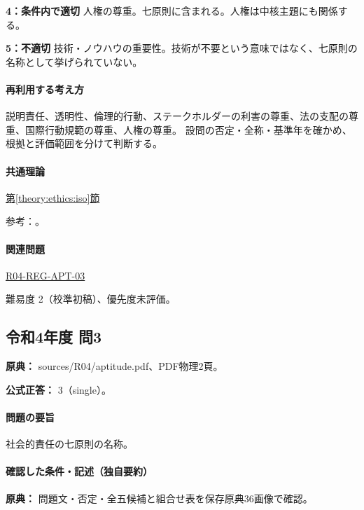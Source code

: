 \noindent\textbf{4：条件内で適切} 人権の尊重。七原則に含まれる。人権は中核主題にも関係する。\par

\noindent\textbf{5：不適切} 技術・ノウハウの重要性。技術が不要という意味ではなく、七原則の名称として挙げられていない。\par

\paragraph{再利用する考え方} 説明責任、透明性、倫理的行動、ステークホルダーの利害の尊重、法の支配の尊重、国際行動規範の尊重、人権の尊重。 設問の否定・全称・基準年を確かめ、根拠と評価範囲を分けて判断する。

\paragraph{共通理論} \hyperref[theory:ethics:iso]{第\ref*{theory:ethics:iso}節}

\par 参考：\cite{eth54_iso_brochure,iso26000}。

\paragraph{関連問題} \hyperref[q:r04-reg-apt-03]{R04-REG-APT-03}

\par 難易度 2（校準初稿）、優先度未評価。

\subsection{令和4年度 問3}
\label{q:r04-reg-apt-03}

\noindent\textbf{原典：} sources/R04/aptitude.pdf、PDF物理2頁。

\textbf{公式正答：} 3（single）。

\paragraph{問題の要旨} 社会的責任の七原則の名称。

\paragraph{確認した条件・記述（独自要約）}\mbox{}\par

\noindent\textbf{原典：} 問題文・否定・全五候補と組合せ表を保存原典36画像で確認。\par

